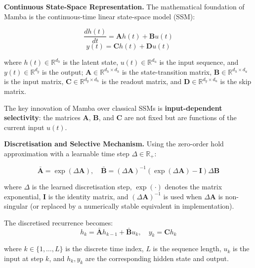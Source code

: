 \documentclass[11pt]{article}
\begin{document}
\medskip
\par\noindent\hspace*{2em}\textbf{Continuous State-Space Representation.} The mathematical foundation of Mamba is the continuous-time linear state-space model (SSM):

\begin{equation}
\frac{dh(t)}{dt} = \mathbf{A} h(t) + \mathbf{B} u(t)
\end{equation}
\begin{equation}
y(t) = \mathbf{C} h(t) + \mathbf{D} u(t)
\end{equation}

where $h(t) \in \mathbb{R}^{d_h}$ is the latent state, $u(t) \in \mathbb{R}^{d_u}$ is the input sequence, and $y(t) \in \mathbb{R}^{d_y}$ is the output; $\mathbf{A} \in \mathbb{R}^{d_h \times d_h}$ is the state-transition matrix, $\mathbf{B} \in \mathbb{R}^{d_h \times d_u}$ is the input matrix, $\mathbf{C} \in \mathbb{R}^{d_y \times d_h}$ is the readout matrix, and $\mathbf{D} \in \mathbb{R}^{d_y \times d_u}$ is the skip matrix.

The key innovation of Mamba over classical SSMs is \textbf{input-dependent selectivity}: the matrices $\mathbf{A}$, $\mathbf{B}$, and $\mathbf{C}$ are not fixed but are functions of the current input $u(t)$.

\medskip
\par\noindent\hspace*{2em}\textbf{Discretisation and Selective Mechanism.} Using the zero-order hold approximation with a learnable time step $\Delta \in \mathbb{R}_+$:

\begin{equation}
\bar{\mathbf{A}} = \exp(\Delta \mathbf{A}), \quad \bar{\mathbf{B}} = (\Delta \mathbf{A})^{-1} (\exp(\Delta \mathbf{A}) - \mathbf{I}) \Delta \mathbf{B}
\end{equation}

where $\Delta$ is the learned discretisation step, $\exp(\cdot)$ denotes the matrix exponential, $\mathbf{I}$ is the identity matrix, and $(\Delta\mathbf{A})^{-1}$ is used when $\Delta\mathbf{A}$ is non-singular (or replaced by a numerically stable equivalent in implementation).

The discretised recurrence becomes:
\begin{equation}
h_k = \bar{\mathbf{A}} h_{k-1} + \bar{\mathbf{B}} u_k, \quad y_k = \mathbf{C} h_k
\end{equation}

where $k \in \{1,\ldots,L\}$ is the discrete time index, $L$ is the sequence length, $u_k$ is the input at step $k$, and $h_k,y_k$ are the corresponding hidden state and output.
\end{document}
